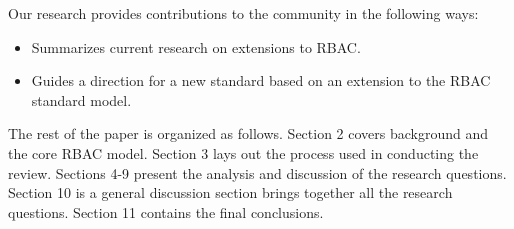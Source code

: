 Our research provides contributions to the community in the following ways:

\begin{itemize}
\setlength{\itemsep}{0.25pt}
\item Summarizes current research on extensions to RBAC.
\item Guides a direction for a new standard based on an extension to the RBAC standard model.
\end{itemize}

The rest of the paper is organized as follows. 
Section 2 covers background and the core RBAC model. 
Section 3 lays out the process used in conducting the review. 
Sections 4-9 present the analysis and discussion of the research questions. 
Section 10 is a general discussion section brings together all the research questions.
Section 11 contains the final conclusions.
